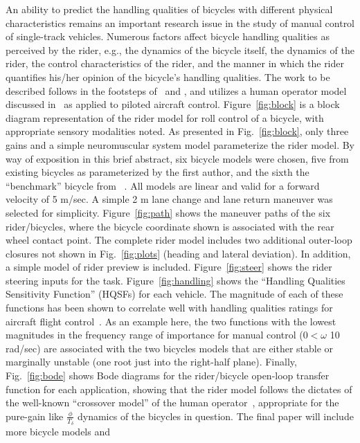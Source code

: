\documentclass{bmd2010a}
\begin{document}
An ability to predict the handling qualities of bicycles with different
physical characteristics remains an important research issue in the study of
manual control of single-track vehicles. Numerous factors affect bicycle
handling qualities as perceived by the rider, e.g., the dynamics of the bicycle
itself, the dynamics of the rider, the control characteristics of the rider,
and the manner in which the rider quantifies his/her opinion of the bicycle's
handling qualities. The work to be described follows in the footsteps
of~\cite{Lunteren1970} and \cite{Weir1972}, and utilizes a human operator model
discussed in~\cite{Hess2006} as applied to
piloted aircraft control. Figure~\ref{fig:block} is a block diagram representation of the
rider model for roll control of a bicycle, with appropriate sensory modalities
noted. As presented in Fig.~\ref{fig:block}, only three gains and a simple neuromuscular
system model parameterize the rider model. By way of exposition in this brief
abstract, six bicycle models were chosen, five from existing bicycles as
parameterized by the first author, and the sixth the ``benchmark'' bicycle from
~\cite{Meijaard2007}. All models are linear and valid for a forward velocity of 5 m/sec. A
simple 2 m lane change and lane return maneuver was selected for simplicity.
Figure~\ref{fig:path} shows the maneuver paths of the six rider/bicycles, where the bicycle
coordinate shown is associated with the rear wheel contact point. The complete
rider model includes two additional outer-loop closures not shown in
Fig.~\ref{fig:plots} (heading and lateral deviation). In addition, a simple model of rider preview
is included. Figure~\ref{fig:steer} shows the rider steering inputs for the
task. Figure~\ref{fig:handling} shows the ``Handling Qualities Sensitivity
Function'' (HQSFs) for each vehicle.
The magnitude of each of these functions has been shown to correlate well with
handling qualities ratings for aircraft flight control~\cite{Hess2006}. As an example here,
the two functions with the lowest magnitudes in the frequency range of
importance for manual control ($0<\omega$  10 rad/sec) are associated with the two
bicycles models that are either stable or marginally unstable (one root just
into the right-half plane). Finally, Fig.~\ref{fig:bode} shows Bode diagrams for the
rider/bicycle open-loop transfer function for each application, showing that
the rider model follows the dictates of the well-known ``crossover model'' of the
human operator~\cite{McRuer1974}, appropriate for the pure-gain like
$\frac{\phi}{T_\delta}$ dynamics of the
bicycles in question. The final paper will include more bicycle models and
\end{document}
